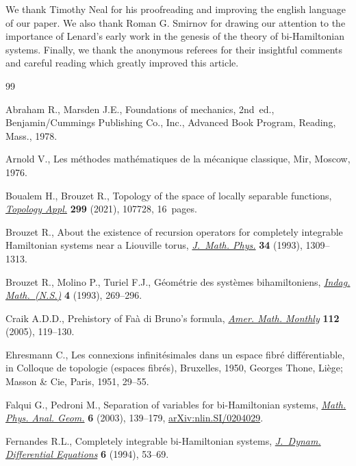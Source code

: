 \documentclass[pdftex]{sigma}%
\numberwithin{equation}{section}
\begin{document}
We thank Timothy Neal for his proofreading and improving the english language of our paper. We also thank Roman G. Smirnov for drawing our attention to the importance of Lenard's early work in the genesis of the theory of bi-Hamiltonian systems. Finally, we thank the anonymous referees for their insightful comments and careful reading which greatly improved this article.

\begin{thebibliography}{99}
\footnotesize\itemsep=0pt

Abraham R., Marsden J.E., Foundations of mechanics, 2nd~ed., Benjamin/Cummings
 Publishing Co., Inc., Advanced Book Program, Reading, Mass., 1978.

Arnold V., Les m\'ethodes math\'ematiques de la m\'ecanique classique, Mir,
 Moscow, 1976.

Boualem H., Brouzet R., Topology of the space of locally separable functions,
 \href{https://doi.org/10.1016/j.topol.2021.107728}{\textit{Topology Appl.}} \textbf{299} (2021), 107728, 16~pages.

Brouzet R., About the existence of recursion operators for completely
 integrable {H}amiltonian systems near a {L}iouville torus, \href{https://doi.org/10.1063/1.530212}{\textit{J.~Math.
 Phys.}} \textbf{34} (1993), 1309--1313.

Brouzet R., Molino P., Turiel F.J., G\'eom\'etrie des syst\`emes
 bihamiltoniens, \href{https://doi.org/10.1016/0019-3577(93)90002-G}{\textit{Indag. Math.~(N.S.)}} \textbf{4} (1993), 269--296.

Craik A.D.D., Prehistory of {F}a\`a di {B}runo's formula, \href{https://doi.org/10.2307/30037410}{\textit{Amer. Math.
 Monthly}} \textbf{112} (2005), 119--130.

Ehresmann C., Les connexions infinit\'esimales dans un espace fibr\'e
 diff\'erentiable, in Colloque de topologie (espaces fibr\'es), {B}ruxelles,
 1950, Georges Thone, Li\`ege; Masson \& Cie, Paris, 1951, 29--55.

Falqui G., Pedroni M., Separation of variables for bi-{H}amiltonian systems,
 \href{https://doi.org/10.1023/A:1024080315471}{\textit{Math. Phys. Anal. Geom.}} \textbf{6} (2003), 139--179,
 \href{https://arxiv.org/abs/nlin.SI/0204029}{arXiv:nlin.SI/0204029}.

Fernandes R.L., Completely integrable bi-{H}amiltonian systems,
 \href{https://doi.org/10.1007/BF02219188}{\textit{J.~Dynam. Differential Equations}} \textbf{6} (1994), 53--69.


\end{thebibliography}
\end{document}
